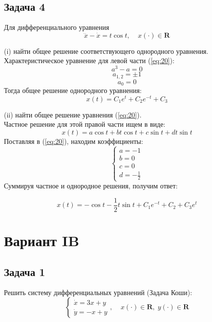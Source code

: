 \documentclass[a4paper, 12pt]{article}
\begin{document}
	\subsection {Задача 4}

Для дифференциального уравнения
\begin{equation}
\dddot{x}-\dot{x}=t\cos{t}, \;\;\;\; x(\cdot)\in \textbf{R}
\label{eq:20}
\end{equation}

(i) найти общее решение соответствующего однородного уравнения.\\
Характеристическое уравнение для левой части (\ref{eq:20}):
\[a^3-a=0\]
\[a_{1,2}=\pm1\]
\[a_0=0\]
Тогда общее решение однородного уравнения:
\begin{equation}
x(t) = C_1e^t+C_2e^{-t}+C_3
\label{eq:21}
\end{equation}

(ii) найти общее решение уравнения (\ref{eq:20}).\\
Частное решение для этой правой части ищем в виде:
\[ x(t) = a\cos{t}+bt\cos{t}+c\sin{t}+dt\sin{t}\]
Поставляя в (\ref{eq:20}), находим коэффициенты: 
\[
\left\{
\begin{array}{lr}
a =-1\\
b = 0\\
c = 0\\
d = -\frac 1 2
\end{array}
\right.
\]
Суммируя частное и однородное решения, получим ответ:

\[x(t) = -\cos{t}-\frac 1 2 t\sin{t}+C_1e^{-t}+C_2+C_3e^t \]











	\section{Вариант IB}
		\subsection {Задача 1}


 Решить систему дифференциальных уравнений (Задача Коши): 
\begin{equation}
\left\{
\begin{array}{lr}
\dot{x} = 3x+y\\
\dot{y} = -x+y
\end{array}
\right.
, \;\;\;\; x(\cdot)\in \textbf{R},\; y(\cdot)\in \textbf{R}
\label{eq:22}
\end{equation}
\end{document}
